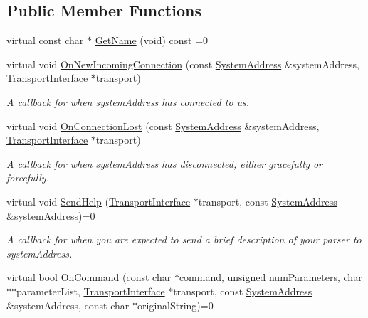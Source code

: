 \subsection*{Public Member Functions}
\begin{DoxyCompactItemize}
\item 
virtual const char $\ast$ \hyperlink{class_rak_net_1_1_command_parser_interface_af9f1b817f383b52f9ad6451def11d35b}{Get\-Name} (void) const =0
\item 
virtual void \hyperlink{class_rak_net_1_1_command_parser_interface_a98004a0af5237980fdc160f6c6fcdc79}{On\-New\-Incoming\-Connection} (const \hyperlink{struct_rak_net_1_1_system_address}{System\-Address} \&system\-Address, \hyperlink{class_rak_net_1_1_transport_interface}{Transport\-Interface} $\ast$transport)
\begin{DoxyCompactList}\small\item\em A callback for when {\itshape system\-Address} has connected to us. \end{DoxyCompactList}\item 
virtual void \hyperlink{class_rak_net_1_1_command_parser_interface_aa275db3922ed1c27fc5ee7ecd6913d4b}{On\-Connection\-Lost} (const \hyperlink{struct_rak_net_1_1_system_address}{System\-Address} \&system\-Address, \hyperlink{class_rak_net_1_1_transport_interface}{Transport\-Interface} $\ast$transport)
\begin{DoxyCompactList}\small\item\em A callback for when {\itshape system\-Address} has disconnected, either gracefully or forcefully. \end{DoxyCompactList}\item 
virtual void \hyperlink{class_rak_net_1_1_command_parser_interface_a6abf857d697bb11230ac0b153c17624a}{Send\-Help} (\hyperlink{class_rak_net_1_1_transport_interface}{Transport\-Interface} $\ast$transport, const \hyperlink{struct_rak_net_1_1_system_address}{System\-Address} \&system\-Address)=0
\begin{DoxyCompactList}\small\item\em A callback for when you are expected to send a brief description of your parser to {\itshape system\-Address}. \end{DoxyCompactList}\item 
virtual bool \hyperlink{class_rak_net_1_1_command_parser_interface_ac568282654986ad63d680d68a98cf757}{On\-Command} (const char $\ast$command, unsigned num\-Parameters, char $\ast$$\ast$parameter\-List, \hyperlink{class_rak_net_1_1_transport_interface}{Transport\-Interface} $\ast$transport, const \hyperlink{struct_rak_net_1_1_system_address}{System\-Address} \&system\-Address, const char $\ast$original\-String)=0
$$
\end{DoxyCompactItemize}
